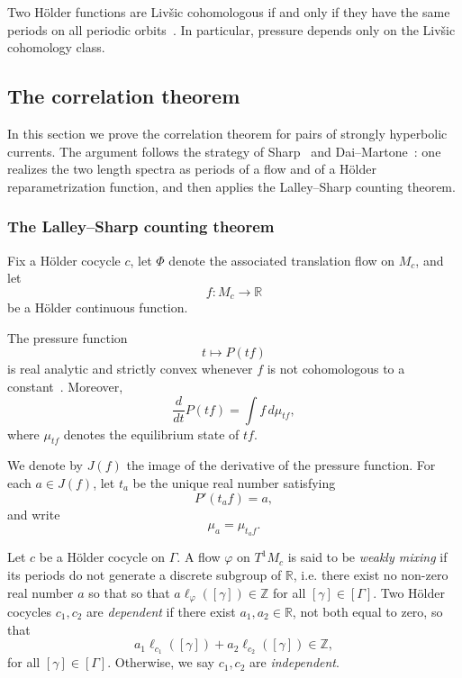 \documentclass[12pt]{amsart}
\numberwithin{equation}{section}
\numberwithin{figure}{section}
\theoremstyle{definition}
\theoremstyle{plain}
\begin{document}
Two H\"older functions are Liv\v{s}ic cohomologous if and only if they have the same periods on all periodic orbits~\cite{Livsic1972}. In particular, pressure depends only on the Liv\v{s}ic cohomology class.
\subsection{The correlation theorem}
\label{sec:corrthm}

In this section we prove the correlation theorem for pairs of strongly hyperbolic currents. The argument follows the strategy of Sharp~\cite{Sharp98:Hyperbolic} and Dai--Martone~\cite{DM23:Correlation}: one realizes the two length spectra as periods of a flow and of a H\"older reparametrization function, and then applies the Lalley--Sharp counting theorem.

\subsubsection{The Lalley--Sharp counting theorem}

Fix a H\"older cocycle $c$, let $\Phi$ denote the associated translation flow on $M_c$, and let
\[
f:M_c\to\mathbb R
\]
be a H\"older continuous function.

The pressure function
\[
t\mapsto P(tf)
\]
is real analytic and strictly convex whenever $f$ is not cohomologous to a constant~\cite[Prop.~4.12]{PP90:Zeta}. Moreover,
\begin{equation}
\label{eq:deriv pressure}
\frac{d}{dt}P(tf)
=
\int f\,d\mu_{tf},
\end{equation}
where $\mu_{tf}$ denotes the equilibrium state of $tf$.

We denote by $J(f)$ the image of the derivative of the pressure function. For each $a\in J(f)$, let $t_a$ be the unique real number satisfying
\[
P'(t_af)=a,
\]
and write
\[
\mu_a=\mu_{t_af}.
\]


Let $c$ be a H\"older cocycle on $\Gamma$.
A flow $\varphi$ on $T^1 M_c$ is said to be \emph{weakly mixing} if its periods
do not generate a discrete subgroup of $\mathbb{R}$, i.e. there exist no non-zero real number $a$ so that
so that $a \ell_\varphi([\gamma]) \in \mathbb{Z}$ for all $[\gamma] \in [\Gamma]$.
Two H\"older cocycles $c_1,c_2$ are \emph{dependent} if
there exist $a_1,a_2 \in \mathbb{R}$, not both equal to zero, so that
\[
a_1 \ell_{c_1}([\gamma]) + a_2 \ell_{c_2}([\gamma]) \in \mathbb{Z},
\]
for all $[\gamma] \in [\Gamma]$. Otherwise, we say $c_1,c_2$ are \emph{independent}.
\end{document}
